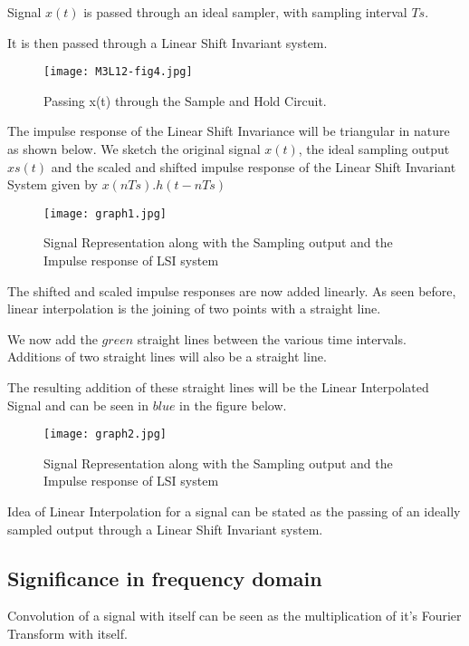 Signal $x(t)$ is passed through an ideal sampler, with sampling interval $Ts$.

It is then passed through a Linear Shift Invariant system.

\begin{figure}[h]
\centering
\texttt{[image: M3L12-fig4.jpg]}
\caption{Passing x(t) through the Sample and Hold Circuit.}
\end{figure}

The impulse response of the Linear Shift Invariance will be triangular in nature as shown below. 
We sketch the original signal $x(t)$, the ideal sampling output $xs(t)$ and the scaled and shifted impulse response of the Linear Shift Invariant System given by $x(nTs).h(t-nTs)$

\begin{figure}[h]
\centering
\texttt{[image: graph1.jpg]}
\caption{Signal Representation along with the Sampling output and the Impulse response of LSI system}
\end{figure}

The shifted and scaled impulse responses are now added linearly. As seen before, linear interpolation is the joining of two points with a straight line.

We now add the $green$ straight lines between the various time intervals. Additions of two straight lines will also be a straight line. 

The resulting addition of these straight lines will be the Linear Interpolated Signal and can be seen in $blue$ in the figure below.
\pagebreak

\begin{figure}[h]
\centering
\texttt{[image: graph2.jpg]}
\caption{Signal Representation along with the Sampling output and the Impulse response of LSI system}
\end{figure}

Idea of Linear Interpolation for a signal can be stated as the passing of an ideally sampled output through a Linear Shift Invariant system.

\subsection{Significance in frequency domain}

Convolution of a signal with itself can be seen as the multiplication of it's Fourier Transform with itself. 

